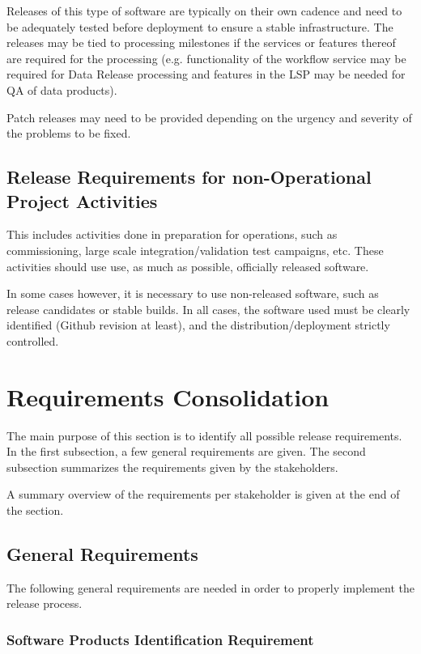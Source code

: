 Releases of this type of software are typically on their own cadence and need to be adequately tested before deployment to ensure a stable infrastructure.
The releases may be tied to processing milestones if the services or features thereof are required for the processing (e.g. functionality of the workflow service may be required for \gls{Data Release} processing and features in the \gls{LSP} may be needed for \gls{QA} of data products).

Patch releases may need to be provided depending on the urgency and severity of the problems to be fixed.


\subsection{Release Requirements for non-Operational Project Activities} \label{sec:nonopsreqs}

This includes activities done in preparation for operations, such as commissioning,
large scale integration/validation test campaigns, etc. These activities should use use,  as much as possible,  officially released software.

In some cases however, it is necessary to use non-released software, such as release candidates or stable builds.
In all cases, the software used must be clearly identified (Github revision at least), and the distribution/deployment strictly controlled.


\newpage
\section{Requirements Consolidation} \label{sec:reqdef}

The main purpose of this section is to identify all possible release requirements.
In the first subsection, a few general requirements are given.
The second subsection summarizes the requirements given by the stakeholders.

A summary overview of the requirements per stakeholder is given at the end of the section.


\subsection{General Requirements} \label{sec:genreq}

The following general requirements are needed in order to properly implement the release process.


\subsubsection{Software Products Identification Requirement} \label{sec:swid}

